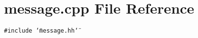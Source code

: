 \section{message.cpp File Reference}
\label{message_8cpp}


{\tt \#include \char`\"{}message.hh\char`\"{}}\par
